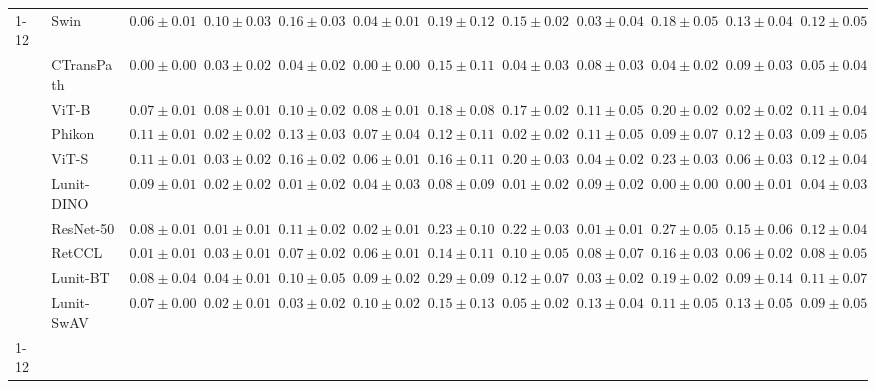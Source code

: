 \begin{tabular}{ll|cccc|c|cccc|c}
\cline{1-12}
\multirow[t]{10}{*}{Mean pool} & Swin & $0.06 \pm 0.01$ & $0.10 \pm 0.03$ & $0.16 \pm 0.03$ & $0.04 \pm 0.01$ & $0.19 \pm 0.12$ & $0.15 \pm 0.02$ & $0.03 \pm 0.04$ & $0.18 \pm 0.05$ & $0.13 \pm 0.04$ & $0.12 \pm 0.05$ \\
 & CTransPath & $\mathbf{0.00 \pm 0.00}$ & $0.03 \pm 0.02$ & $0.04 \pm 0.02$ & $\mathbf{0.00 \pm 0.00}$ & $0.15 \pm 0.11$ & $0.04 \pm 0.03$ & $0.08 \pm 0.03$ & $0.04 \pm 0.02$ & $0.09 \pm 0.03$ & $0.05 \pm 0.04$ \\
 & ViT-B & $0.07 \pm 0.01$ & $0.08 \pm 0.01$ & $0.10 \pm 0.02$ & $0.08 \pm 0.01$ & $0.18 \pm 0.08$ & $0.17 \pm 0.02$ & $0.11 \pm 0.05$ & $0.20 \pm 0.02$ & $0.02 \pm 0.02$ & $0.11 \pm 0.04$ \\
 & Phikon & $0.11 \pm 0.01$ & $0.02 \pm 0.02$ & $0.13 \pm 0.03$ & $0.07 \pm 0.04$ & $0.12 \pm 0.11$ & $0.02 \pm 0.02$ & $0.11 \pm 0.05$ & $0.09 \pm 0.07$ & $0.12 \pm 0.03$ & $0.09 \pm 0.05$ \\
 & ViT-S & $0.11 \pm 0.01$ & $0.03 \pm 0.02$ & $0.16 \pm 0.02$ & $0.06 \pm 0.01$ & $0.16 \pm 0.11$ & $0.20 \pm 0.03$ & $0.04 \pm 0.02$ & $0.23 \pm 0.03$ & $0.06 \pm 0.03$ & $0.12 \pm 0.04$ \\
 & Lunit-DINO & $0.09 \pm 0.01$ & $0.02 \pm 0.02$ & $\mathbf{0.01 \pm 0.02}$ & $0.04 \pm 0.03$ & $\mathbf{0.08 \pm 0.09}$ & $\mathbf{0.01 \pm 0.02}$ & $0.09 \pm 0.02$ & $\mathbf{0.00 \pm 0.00}$ & $\mathbf{0.00 \pm 0.01}$ & $\mathbf{0.04 \pm 0.03}$ \\
 & ResNet-50 & $0.08 \pm 0.01$ & $\mathbf{0.01 \pm 0.01}$ & $0.11 \pm 0.02$ & $0.02 \pm 0.01$ & $0.23 \pm 0.10$ & $0.22 \pm 0.03$ & $\mathbf{0.01 \pm 0.01}$ & $0.27 \pm 0.05$ & $0.15 \pm 0.06$ & $0.12 \pm 0.04$ \\
 & RetCCL & $0.01 \pm 0.01$ & $0.03 \pm 0.01$ & $0.07 \pm 0.02$ & $0.06 \pm 0.01$ & $0.14 \pm 0.11$ & $0.10 \pm 0.05$ & $0.08 \pm 0.07$ & $0.16 \pm 0.03$ & $0.06 \pm 0.02$ & $0.08 \pm 0.05$ \\
 & Lunit-BT & $0.08 \pm 0.04$ & $0.04 \pm 0.01$ & $0.10 \pm 0.05$ & $0.09 \pm 0.02$ & $0.29 \pm 0.09$ & $0.12 \pm 0.07$ & $0.03 \pm 0.02$ & $0.19 \pm 0.02$ & $0.09 \pm 0.14$ & $0.11 \pm 0.07$ \\
 & Lunit-SwAV & $0.07 \pm 0.00$ & $0.02 \pm 0.01$ & $0.03 \pm 0.02$ & $0.10 \pm 0.02$ & $0.15 \pm 0.13$ & $0.05 \pm 0.02$ & $0.13 \pm 0.04$ & $0.11 \pm 0.05$ & $0.13 \pm 0.05$ & $0.09 \pm 0.05$ \\
\cline{1-12}
\bottomrule
\end{tabular}
